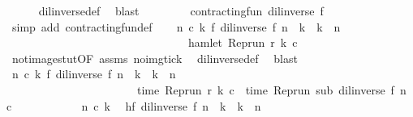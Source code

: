 \begin{isabellebody}
\ \ \ \ \isamarkupfalse%
\ dil{\isacharunderscore}inverse{\isacharunderscore}def\ \isamarkupfalse%
\ blast\isanewline
\isanewline
\ \ \isamarkupfalse%
\ {}\ {}\ {}\ \isamarkupfalse%
\ {\isacharasterisk}{\isacharcolon}{\isacartoucheopen}contracting{\isacharunderscore}fun\ {\isacharparenleft}dil{\isacharunderscore}inverse\ f{\isacharparenright}{\isacartoucheclose}\ \isamarkupfalse%
\ {\isacharparenleft}simp\ add{\isacharcolon}\ contracting{\isacharunderscore}fun{\isacharunderscore}def{\isacharparenright}\isanewline
\isanewline
\ \ \isamarkupfalse%
\ {}{\isacharcolon}{\isacartoucheopen}{\isasymforall}n\ c\ k{\isachardot}\ f\ {\isacharparenleft}{\isacharparenleft}dil{\isacharunderscore}inverse\ f{\isacharparenright}\ n{\isacharparenright}\ {\isacharless}\ k\ {\isasymand}\ k\ {\isasymle}\ n\isanewline
\ \ \ \ \ \ \ \ \ \ \ \ \ \ \ \ \ \ \ \ \ \ \ \ \ \ \ \ \ \ {\isasymlongrightarrow}\ {\isasymnot}\ hamlet\ {\isacharparenleft}{\isacharparenleft}Rep{\isacharunderscore}run\ r{\isacharparenright}\ k\ c{\isacharparenright}{\isacartoucheclose}\isanewline
\ \ \ \ \isamarkupfalse%
\ not{\isacharunderscore}image{\isacharunderscore}stut{\isacharbrackleft}OF\ assms{\isacharbrackright}\ no{\isacharunderscore}img{\isacharunderscore}tick\ \isamarkupfalse%
\ dil{\isacharunderscore}inverse{\isacharunderscore}def\ \isamarkupfalse%
\ blast\isanewline
\isanewline
\ \ \isamarkupfalse%
\ {}{\isacharcolon}{\isacartoucheopen}{\isacharparenleft}{\isasymforall}n\ c\ k{\isachardot}\ f\ {\isacharparenleft}{\isacharparenleft}dil{\isacharunderscore}inverse\ f{\isacharparenright}\ n{\isacharparenright}\ {\isasymle}\ k\ {\isasymand}\ k\ {\isasymle}\ n\isanewline
\ \ \ \ \ \ \ \ \ \ \ \ \ \ \ \ \ \ \ \ \ \ {\isasymlongrightarrow}\ time\ {\isacharparenleft}{\isacharparenleft}Rep{\isacharunderscore}run\ r{\isacharparenright}\ k\ c{\isacharparenright}\ {\isacharequal}\ time\ {\isacharparenleft}{\isacharparenleft}Rep{\isacharunderscore}run\ sub{\isacharparenright}\ {\isacharparenleft}{\isacharparenleft}dil{\isacharunderscore}inverse\ f{\isacharparenright}\ n{\isacharparenright}\ c{\isacharparenright}{\isacharparenright}{\isacartoucheclose}\isanewline
\ \ \isamarkupfalse%
\ {\isacharminus}\isanewline
\ \ \ \ \isacommand{{\isacharbraceleft}}\isamarkupfalse%
\ \isamarkupfalse%
\ n\ c\ k\ \isamarkupfalse%
\ h{\isacharcolon}{\isacartoucheopen}f\ {\isacharparenleft}{\isacharparenleft}dil{\isacharunderscore}inverse\ f{\isacharparenright}\ n{\isacharparenright}\ {\isasymle}\ k\ {\isasymand}\ k\ {\isasymle}\ n{\isacartoucheclose}\isanewline

\end{isabellebody}
